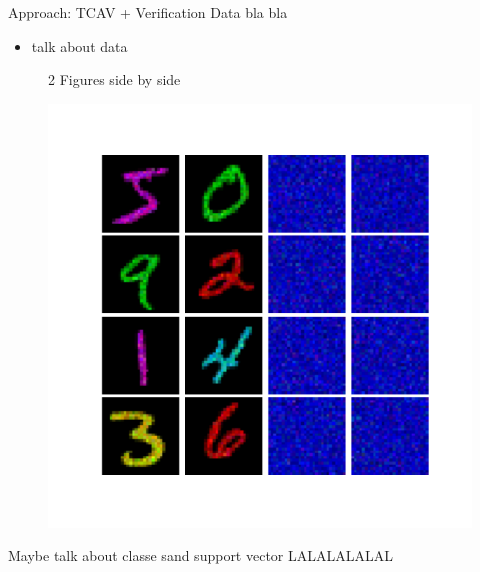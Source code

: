\documentclass[final]{beamer}
\begin{document}
\begin{frame}[fragile]{}
\begin{textblock}{\colwidth}
\begin{paddedBlock}{Approach: TCAV + Verification}
\alert{Data bla bla}
  \begin{itemize}
    \item talk about data
  \end{itemize}

\begin{figure}%
    \centering
    \qquad
    \caption{2 Figures side by side}%
    \label{fig:example}%
\end{figure}

\begin{figure}
    \centering
    \includegraphics[width=.2\textwidth]{img/cav_viz}
    \label{fig:big}
\end{figure}


\alert{Maybe talk about classe sand support vector}
LALALALALAL


\end{paddedBlock}
\end{textblock}
\end{frame}
\end{document}
